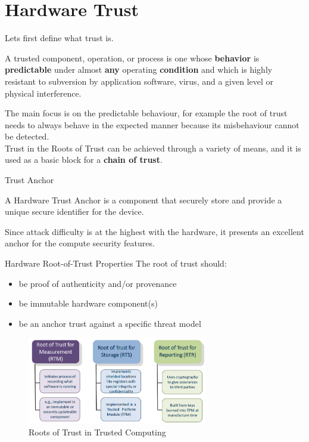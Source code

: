 \chapter{Hardware Trust}
Lets first define what trust is.
\begin{boxH}
  A trusted component, operation, or process is one whose \textbf{behavior} is \textbf{predictable}
  under almost \textbf{any} operating \textbf{condition} and which is highly resistant to subversion
  by application software, virus, and a given level or physical interference.
\end{boxH}
The main focus is on the predictable behaviour, for example the root of trust needs to always behave
in the expected manner because its misbehaviour cannot be detected.\\
Trust in the Roots of Trust can be achieved through a variety of means, and it is used as a basic
block for a \textbf{chain of trust}.

\begin{section}{Trust Anchor}
  \begin{boxH}
    A Hardware Trust Anchor is a component that securely store and provide a unique secure
    identifier for the device.
  \end{boxH}
  Since attack difficulty is at the highest with the hardware, it presents an excellent anchor for
  the compute security features.

\end{section}

\begin{section}{Hardware Root-of-Trust Properties}
  The root of trust should:
  \begin{itemize}
    \item be proof of authenticity and/or provenance 
    \item be immutable hardware component(s)
    \item be an anchor trust against a specific threat model
  \end{itemize}

  \begin{figure}[H]
    \centering
    \includegraphics[width=0.7\textwidth]{img/hardware/rot schema.png}
    \caption{Roots of Trust in Trusted Computing}
  \end{figure}
\end{section}


